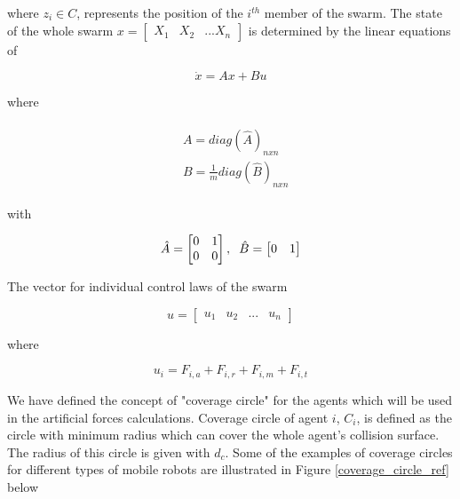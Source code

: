 where  $z_i \in C$, represents the position of the $i^{th}$ member of the swarm. The state of the whole swarm $x= \begin{bmatrix}
X_1 & X_2 & ... X_n
\end{bmatrix}$ is determined by the linear equations of \cite{17}

\begin{equation}
\dot{x} = Ax + Bu
\end{equation}

where

\begin{align}
\begin{split}
&A = diag\left(\hat{A}\right)_{nxn}\\
&B = \frac{1}{m} diag\left(\hat{B}\right)_{nxn}
\end{split}
\end{align}

with

\begin{equation}
\hat{A} = \begin{bmatrix}
0&1\\0&0
\end{bmatrix} , \hspace{0.2cm} \hat{B} = \begin{bmatrix}
0&1
\end{bmatrix}
\end{equation}
			
The vector for individual control laws of the swarm

\begin{equation}
u = \begin{bmatrix}
u_1 & u_2 & ... & u_n
\end{bmatrix}
\end{equation}

where

\begin{equation}
u_i = F_{i,a} + F_{i,r} + F_{i,m} + F_{i,t}
\end{equation}

We have defined the concept of "coverage circle"	for the agents which will be used in the artificial forces calculations. Coverage circle of agent $i$, $C_i$, is defined as the circle with minimum radius which can cover the whole agent's collision surface. The radius of this circle is given with $d_c$. Some of the examples of coverage circles for different types of mobile robots are illustrated in Figure \ref{coverage_circle_ref} below
		
